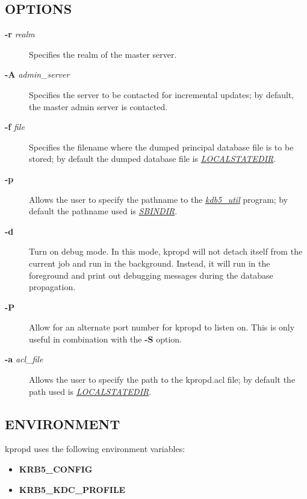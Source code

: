 \documentclass[letterpaper,10pt,english]{sphinxmanual}
\begin{document}
\subsection{OPTIONS}
\label{admin/admin_commands/kpropd:options}\begin{description}
\item[{\textbf{-r} \emph{realm}}] \leavevmode
Specifies the realm of the master server.

\item[{\textbf{-A} \emph{admin\_server}}] \leavevmode
Specifies the server to be contacted for incremental updates; by
default, the master admin server is contacted.

\item[{\textbf{-f} \emph{file}}] \leavevmode
Specifies the filename where the dumped principal database file is
to be stored; by default the dumped database file is {\hyperref[mitK5defaults:paths]{\emph{LOCALSTATEDIR}}}.

\item[{\textbf{-p}}] \leavevmode
Allows the user to specify the pathname to the {\hyperref[admin/admin_commands/kdb5_util:kdb5-util-8]{\emph{kdb5\_util}}}
program; by default the pathname used is {\hyperref[mitK5defaults:paths]{\emph{SBINDIR}}}.

\item[{\textbf{-d}}] \leavevmode
Turn on debug mode.  In this mode, kpropd will not detach
itself from the current job and run in the background.  Instead,
it will run in the foreground and print out debugging messages
during the database propagation.

\item[{\textbf{-P}}] \leavevmode
Allow for an alternate port number for kpropd to listen on.  This
is only useful in combination with the \textbf{-S} option.

\item[{\textbf{-a} \emph{acl\_file}}] \leavevmode
Allows the user to specify the path to the kpropd.acl file; by
default the path used is {\hyperref[mitK5defaults:paths]{\emph{LOCALSTATEDIR}}}.

\end{description}


\subsection{ENVIRONMENT}
\label{admin/admin_commands/kpropd:environment}
kpropd uses the following environment variables:
\begin{itemize}
\item {} 
\textbf{KRB5\_CONFIG}

\item {} 
\textbf{KRB5\_KDC\_PROFILE}

\end{itemize}
\end{document}
